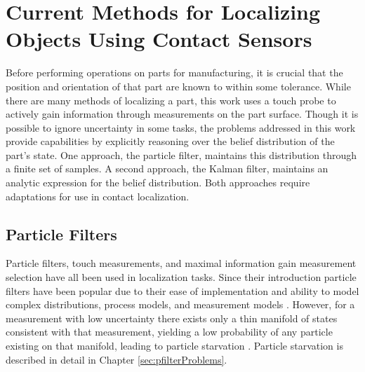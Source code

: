 \documentclass[../thesis.tex]{subfiles}
\begin{document}
\section{Current Methods for Localizing Objects Using Contact Sensors}

Before performing operations on parts for manufacturing, it is crucial that the position and orientation of that part are known to within some tolerance.
While there are many methods of localizing a part, this work uses a touch probe to actively gain information through measurements on the part surface.
Though it is possible to ignore uncertainty in some tasks, the problems addressed in this work provide capabilities by explicitly reasoning over the belief distribution of the part's state.
One approach, the particle filter, maintains this distribution through a finite set of samples.
A second approach, the Kalman filter, maintains an analytic expression for the belief distribution.
Both approaches require adaptations for use in contact localization.





\subsection{Particle Filters}
Particle filters, touch measurements, and maximal information gain measurement selection have all been used in localization tasks. 
Since their introduction particle filters have been popular due to their ease of implementation and ability to model complex distributions, process models, and measurement models \cite{Thrun2000a}. 
However, for a measurement with low uncertainty there exists only a thin manifold of states consistent with that measurement, yielding a low probability of any particle existing on that manifold, leading to particle starvation \cite{Thrun2000}.
Particle starvation is described in detail in Chapter \ref{sec:pfilterProblems}.
\end{document}
